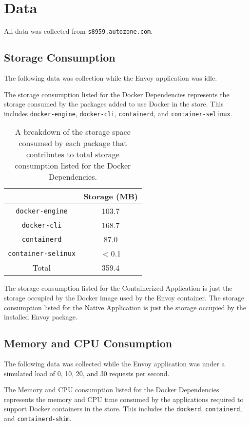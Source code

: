 \documentclass{article}
\begin{document}
\section{Data}
All data was collected from \texttt{s8959.autozone.com}.

\subsection{Storage Consumption}
The following data was collection while the Envoy application was idle.

The storage consumption listed for the Docker Dependencies represents the storage consumed by the packages added to use Docker in the store. This includes \texttt{docker-engine}, \texttt{docker-cli}, \texttt{containerd}, and \texttt{container-selinux}.

\begin{table}[H]
\begin{tabular}{ |c|c| }
 \hline
   & Storage (MB) \\ 
 \hline
 \texttt{docker-engine} & 103.7 \\
 \hline
 \texttt{docker-cli} & 168.7 \\
 \hline
 \texttt{containerd} & 87.0 \\
 \hline
 \texttt{container-selinux} & $<$0.1 \\
 \hline\hline
 Total & 359.4 \\
 \hline
\end{tabular}
\caption{A breakdown of the storage space consumed by each package that contributes to total storage consumption listed for the Docker Dependencies.}
\label{storage-breakdown}
\end{table}

The storage consumption listed for the Containerized Application is just the storage occupied by the Docker image used by the Envoy container. The storage consumption listed for the Native Application is just the storage occupied by the installed Envoy package.

\subsection{Memory and CPU Consumption}
The following data was collected while the Envoy application was under a simulated load of 0, 10, 20, and 30 requests per second.

The Memory and CPU consumption listed for the Docker Dependencies represents the memory and CPU time consumed by the applications required to support Docker containers in the store. This includes the \texttt{dockerd}, \texttt{containerd}, and \texttt{containerd-shim}.
\end{document}
